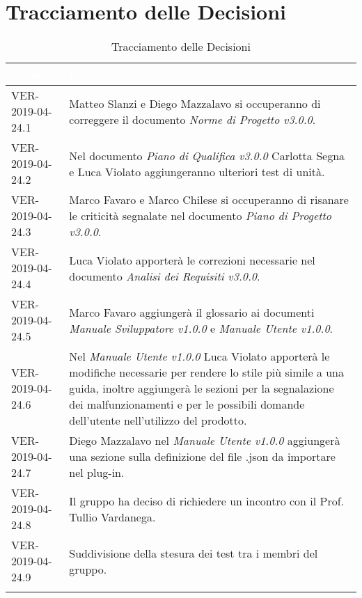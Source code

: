 \newpage
\section{Tracciamento delle Decisioni}

\begin{longtable}{|C{.40\textwidth}|C{.60\textwidth}|}
\hline
{}\textbf{\textcolor{white}{Codice}} & \textbf{\textcolor{white}{Decisione}}\\
\hline
VER-2019-04-24.1 & Matteo Slanzi e Diego Mazzalavo si occuperanno di correggere il documento \textit{Norme di Progetto v3.0.0}. \\
\hline
{}VER-2019-04-24.2 & Nel documento \textit{Piano di Qualifica v3.0.0} Carlotta Segna e Luca Violato aggiungeranno ulteriori test di unità. \\
\hline
VER-2019-04-24.3 & Marco Favaro e Marco Chilese si occuperanno di risanare le criticità segnalate nel documento \textit{Piano di Progetto v3.0.0}.  \\
\hline
{}VER-2019-04-24.4 & Luca Violato apporterà le correzioni necessarie nel documento \textit{Analisi dei Requisiti v3.0.0}.\\
\hline
VER-2019-04-24.5 & Marco Favaro aggiungerà il glossario ai documenti \textit{Manuale Sviluppatore v1.0.0} e \textit{Manuale Utente v1.0.0}. \\
\hline
{}VER-2019-04-24.6 & Nel \textit{Manuale Utente v1.0.0} Luca Violato apporterà le modifiche necessarie per rendere lo stile più simile a una guida, inoltre aggiungerà le sezioni per la segnalazione dei malfunzionamenti e per le possibili domande dell'utente nell'utilizzo del prodotto.  \\
\hline
VER-2019-04-24.7 & Diego Mazzalavo nel  \textit{Manuale Utente v1.0.0} aggiungerà una sezione sulla definizione del file .json da importare nel plug-in. \\
\hline
{} VER-2019-04-24.8 & Il gruppo ha deciso di richiedere un incontro con il Prof. Tullio Vardanega. \\
\hline
VER-2019-04-24.9 & Suddivisione della stesura dei test tra i membri del gruppo. \\
\hline

\caption{Tracciamento delle Decisioni}
\end{longtable}
